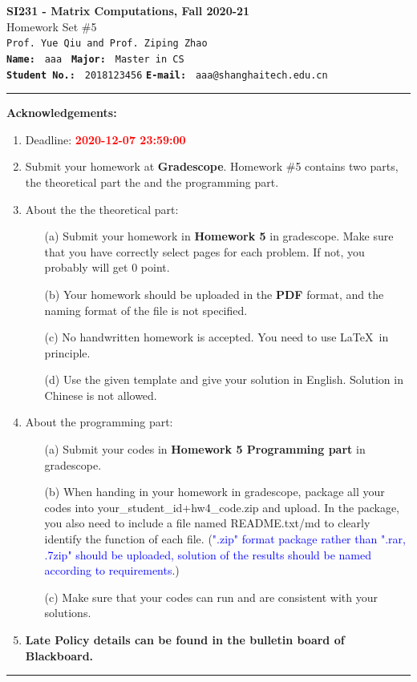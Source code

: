 \documentclass[english,onecolumn]{IEEEtran}
\begin{document}
\begin{center}
	\textbf{\LARGE{SI231 - Matrix Computations, Fall 2020-21}}\\
	{\Large Homework Set \#5}\\
	\texttt{Prof. Yue Qiu and Prof. Ziping Zhao}\\
	\texttt{\textbf{Name:}}   	\texttt{ aaa }  		\hspace{1bp}
	\texttt{\textbf{Major:}}  	\texttt{ Master in CS } 	\\
	\texttt{\textbf{Student No.:}} 	\texttt{ 2018123456}     \hspace{1bp}
	\texttt{\textbf{E-mail:}} 	\texttt{ aaa@shanghaitech.edu.cn}
\par\end{center}

\noindent
\rule{\linewidth}{0.4pt}
{\bf {\large Acknowledgements:}}
\begin{enumerate}
    \item Deadline: \textcolor{red}{\textbf{2020-12-07 23:59:00}}
    \item Submit your homework at \textbf{Gradescope}.
    Homework \#5 contains two parts, the theoretical part the and the programming part.
    \item About the the theoretical part:
    \begin{enumerate}
            \item[(a)] Submit your homework in \textbf{Homework 5} in gradescope. Make sure that you have correctly select pages for each problem. If not, you probably will get 0 point.
            \item[(b)] Your homework should be uploaded in the \textbf{PDF} format, and the naming format of the file is not specified.
            \item[(c)] No handwritten homework is accepted. You need to use \LaTeX $\,$ in principle.
            \item[(d)] Use the given template and give your solution in English. Solution in Chinese is not allowed. 
        \end{enumerate}
  \item About the programming part:
  \begin{enumerate}
      \item[(a)] Submit your codes in \textbf{Homework 5 Programming part} in gradescope. 
      \item[(b)] When handing in your homework in gradescope, package all your codes into {\sf your\_student\_id+hw4\_code.zip} and upload. In the package, you also need to include a file named {\sf README.txt/md} to clearly identify the function of each file. (\textcolor{blue}{".zip" format package rather than ".rar, .7zip" should be uploaded, solution of the results should be named according to requirements}.)
     \item[(c)] Make sure that your codes can run and are consistent with your solutions.
  \end{enumerate}
  \item \textbf{Late Policy details can be found in the bulletin board of Blackboard.}
\end{enumerate}
\rule{\linewidth}{0.4pt}
\end{document}
